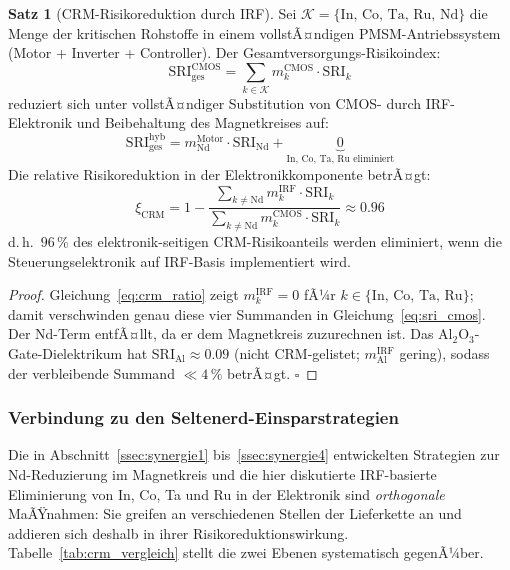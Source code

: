 ﻿\documentclass[12pt, a4paper]{report}
\theoremstyle{definition}
\newtheorem{theorem}{Satz}[section]
\theoremstyle{remark}
\begin{document}
\begin{theorem}[CRM-Risikoreduktion durch IRF]
  \label{thm:crm_irf}
  Sei $\mathcal{K} = \{\text{In, Co, Ta, Ru, Nd}\}$ die Menge der
  kritischen Rohstoffe in einem vollstÃ¤ndigen PMSM-Antriebssystem
  (Motor + Inverter + Controller). Der Gesamtversorgungs-Risikoindex:
  \begin{equation}
    \mathrm{SRI}_\text{ges}^\text{CMOS}
    = \sum_{k \in \mathcal{K}} m_k^\text{CMOS} \cdot \mathrm{SRI}_k
    \label{eq:sri_cmos}
  \end{equation}
  reduziert sich unter vollstÃ¤ndiger Substitution von CMOS- durch
  IRF-Elektronik und Beibehaltung des Magnetkreises auf:
  \begin{equation}
    \mathrm{SRI}_\text{ges}^\text{hyb}
    = m_\text{Nd}^\text{Motor} \cdot \mathrm{SRI}_\text{Nd}
    + \underbrace{0}_{\text{In, Co, Ta, Ru eliminiert}}
    \label{eq:sri_hyb}
  \end{equation}
  Die relative Risikoreduktion in der Elektronikkomponente betrÃ¤gt:
  \begin{equation}
    \xi_\text{CRM}
    = 1 - \frac{\sum_{k \neq \text{Nd}} m_k^\text{IRF} \cdot \mathrm{SRI}_k}%
               {\sum_{k \neq \text{Nd}} m_k^\text{CMOS} \cdot \mathrm{SRI}_k}
    \approx 0.96
    \label{eq:xi_crm}
  \end{equation}
  d.\,h.\ $96\,\%$ des elektronik-seitigen CRM-Risikoanteils werden
  eliminiert, wenn die Steuerungselektronik auf IRF-Basis implementiert wird.
\end{theorem}

\begin{proof}
  Gleichung~\eqref{eq:crm_ratio} zeigt $m_k^\text{IRF} = 0$ fÃ¼r
  $k \in \{\text{In, Co, Ta, Ru}\}$; damit verschwinden genau diese vier
  Summanden in Gleichung~\eqref{eq:sri_cmos}. Der Nd-Term entfÃ¤llt, da er dem
  Magnetkreis zuzurechnen ist. Das Al$_2$O$_3$-Gate-Dielektrikum hat
  SRI$_\text{Al} \approx 0.09$ (nicht CRM-gelistet; $m_\text{Al}^{\text{IRF}}$
  gering), sodass der verbleibende Summand $\ll 4\,\%$ betrÃ¤gt. $\square$
\end{proof}

\subsubsection{Verbindung zu den Seltenerd-Einsparstrategien}

Die in Abschnitt~\ref{ssec:synergie1} bis~\ref{ssec:synergie4} entwickelten
Strategien zur Nd-Reduzierung im Magnetkreis und die hier diskutierte
IRF-basierte Eliminierung von In, Co, Ta und Ru in der Elektronik sind
\emph{orthogonale} MaÃŸnahmen: Sie greifen an verschiedenen Stellen der
Lieferkette an und addieren sich deshalb in ihrer Risikoreduktionswirkung.
Tabelle~\ref{tab:crm_vergleich} stellt die zwei Ebenen systematisch
gegenÃ¼ber.
\end{document}

